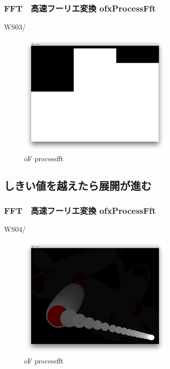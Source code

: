 \documentclass[10pt, dvipdfmx]{beamer}
\begin{document}
        \begin{frame}
            \frametitle{FFT　高速フーリエ変換 ofxProcessFft}
                \tiny
                WS03/
                \begin{figure}[htb]
                    \includegraphics[width=75mm]{images/fft-2.png}
                    \caption{oF processfft}
                    \label{fig:fft-2}
                \end{figure}
        \end{frame}

    \subsection{しきい値を越えたら展開が進む}
        \begin{frame}
            \frametitle{FFT　高速フーリエ変換 ofxProcessFft}
                \tiny
                WS04/
                \begin{figure}[htb]
                    \includegraphics[width=75mm]{images/fft-3.png}
                    \caption{oF processfft}
                    \label{fig:fft-3}
                \end{figure}
        \end{frame}
\end{document}
